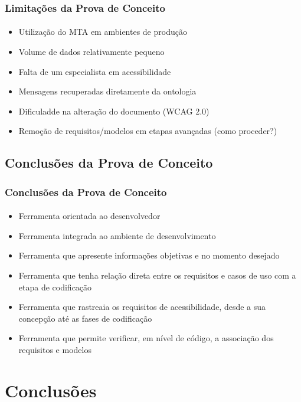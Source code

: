 \documentclass{beamer}
\begin{document}
\begin{frame}
\frametitle{Limitações da Prova de Conceito}
\framesubtitle{}

\begin{itemize}
  \item Utilização do MTA em ambientes de produção
  \item Volume de dados relativamente pequeno
  \item Falta de um especialista em acessibilidade
  \item Mensagens recuperadas diretamente da ontologia
  \item Dificuladde na alteração do documento (WCAG 2.0)
  \item Remoção de requisitos/modelos em etapas avançadas (como proceder?)
\end{itemize}

\end{frame}

\subsection[Conclusões da Prova de Conceito]{Conclusões da Prova de Conceito}

\begin{frame}
\frametitle{Conclusões da Prova de Conceito}
\framesubtitle{}

\begin{itemize}
  \item Ferramenta orientada ao desenvolvedor
  \item Ferramenta integrada ao ambiente de desenvolvimento
  \item Ferramenta que apresente informações objetivas e no momento desejado
  \item Ferramenta que tenha relação direta entre os requisitos e casos de uso com a etapa de codificação
  \item Ferramenta que rastreaia os requisitos de acessibilidade, desde a sua concepção até as fases de codificação
  \item Ferramenta que permite verificar, em nível de código, a associação dos requisitos e modelos
\end{itemize}

\end{frame}

\section{Conclusões}
\end{document}
